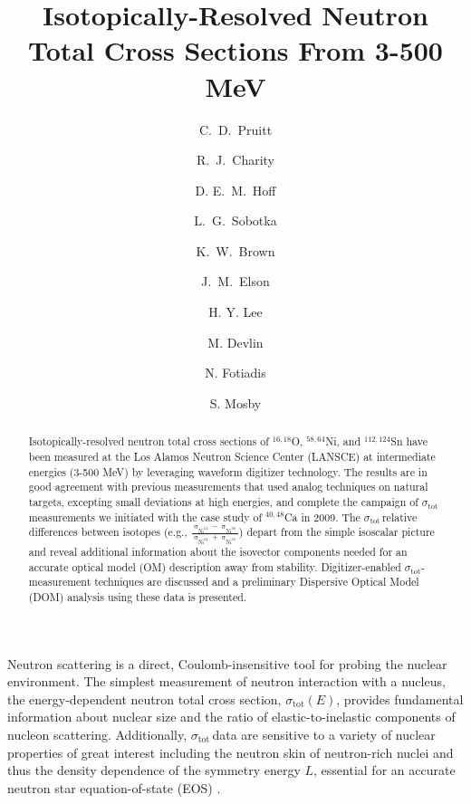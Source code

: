\documentclass[twocolumn,secnumarabic,amssymb, nobibnotes, aps, prl,
superscriptaddress, nobalancelastpage]{revtex4}
\newcommand{\tot}{\ensuremath{\sigma_{\text{tot}}}}
\newcommand{\tots}{\ensuremath{\sigma_{\text{tot}}\,}}
\newcommand{\totE}{\ensuremath{\sigma_{\text{tot}}(E)}}
\begin{document}
\begin{abstract}
    Isotopically-resolved neutron total cross sections of $^{16,18}$O,
    $^{58,64}$Ni, and $^{112,124}$Sn have been measured at the Los Alamos
    Neutron Science Center (LANSCE) at intermediate energies (3-500 MeV) by
    leveraging waveform digitizer technology. The results are in good agreement
    with previous measurements that used analog techniques on natural targets,
    excepting small deviations at high energies, and complete the campaign of
    \tot measurements we initiated with the case study of $^{40,48}$Ca in 2009.
    The \tots relative differences between isotopes (e.g.,
    $\frac{\upsigma_{\text{Ni}^{64}}-\upsigma_{\text{Ni}^{58}}}
    {\upsigma_{\text{Ni}^{64}}+\upsigma_{\text{Ni}^{58}}}$)
    depart from the simple isoscalar picture and reveal additional
    information about the isovector components needed for an
    accurate optical model (OM) description away from stability. Digitizer-enabled 
    \tot-measurement techniques are discussed and a preliminary Dispersive Optical
    Model (DOM) analysis using these data is presented.
\end{abstract}

\title{Isotopically-Resolved Neutron Total Cross Sections From 3-500 MeV}

\author{C.~D.~Pruitt}  
\author{R.~J.~Charity}
\author{D. E.~M.~Hoff}  
\author{L.~G.~Sobotka}
\author{K.~W.~Brown} 
\author{J.~M.~Elson}

\author{H. Y. Lee}
\author{M. Devlin}
\author{N. Fotiadis}
\author{S. Mosby}
\maketitle

Neutron scattering is a direct, Coulomb-insensitive tool for probing the nuclear
environment. The simplest measurement of neutron interaction with a nucleus,
the energy-dependent neutron total cross section, \totE, provides fundamental 
information about
nuclear size and the ratio of elastic-to-inelastic components of nucleon
scattering. Additionally, \tots data are sensitive to a variety of nuclear 
properties of great interest including the neutron skin of neutron-rich nuclei
\cite{Mahzoon2017} and thus the density dependence of the symmetry 
energy $L$, essential for an accurate neutron star equation-of-state (EOS)
\cite{Fattoyev2012, Vinas2014, Brown2000}. 
\end{document}
